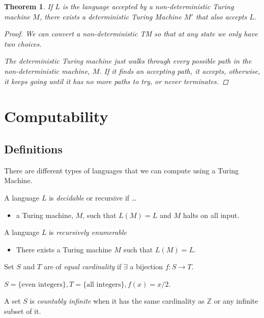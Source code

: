 \documentclass[12pt]{article}
\newtheorem{thm}{Theorem}
\theoremstyle{definition}
\begin{document}
\begin{thm}
	If $L$ is the language accepted by a non-deterministic Turing machine $M$,
	there exists a deterministic Turing Machine $M'$ that also accepts $L$.
	\begin{proof}
		We can convert a non-deterministic TM so that at any state we only have
		two choices.

		The deterministic Turing machine just walks through every possible path
		in the non-deterministic machine, $M$. If it finds an accepting path, it
		accepts, otherwise, it keeps going until it has no more paths to try, or
		never terminates.  
	\end{proof}
\end{thm}

\section{Computability}

\subsection{Definitions}

There are different types of languages that we can compute using a Turing
Machine.

A language $L$ is \emph{decidable} or recursive if \dots
\begin{itemize}
	\item a Turing machine, $M$, such that $L(M)=L$ and $M$ halts on all input.
\end{itemize}

A language $L$ is \emph{recursively enumerable}
\begin{itemize}
	\item There exists a Turing machine $M$ such that $L(M)=L$.
\end{itemize}

Set $S$ and $T$ are of \emph{equal cardinality} if $\exists$ a bijection $f:S
\to T$.

$S = \{\text{even integers}\}, T = \{\text{all integers}\}, f(x) = x/2$.

A set $S$ is \emph{countably infinite} when it has the same cardinality as
$\mathbb{Z}$ or any infinite subset of it.
\end{document}
